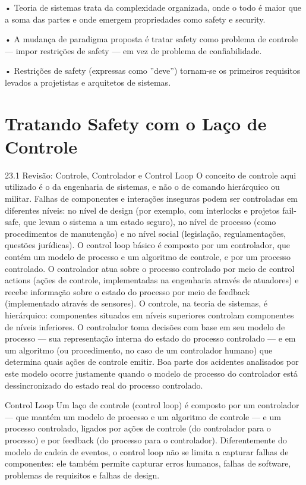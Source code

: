 • Teoria de sistemas trata da complexidade organizada, onde o todo é maior que a soma das partes e onde emergem propriedades como safety e security.

• A mudança de paradigma proposta é tratar safety como problema de controle — impor restrições de safety — em vez de problema de confiabilidade.

• Restrições de safety (expressas como ”deve”) tornam-se os primeiros requisitos levados a projetistas e arquitetos de sistemas.

\chapter{Tratando Safety com o Laço de Controle}

23.1 Revisão: Controle, Controlador e Control Loop O conceito de controle aqui utilizado é o da engenharia de sistemas, e não o de comando hierárquico ou militar. Falhas de componentes e interações inseguras podem ser controladas em diferentes níveis: no nível de design (por exemplo, com interlocks e projetos fail-safe, que levam o sistema a um estado seguro), no nível de processo (como procedimentos de manutenção) e no nível social (legislação, regulamentações, questões jurídicas). O control loop básico é composto por um controlador, que contém um modelo de processo e um algoritmo de controle, e por um processo controlado. O controlador atua sobre o processo controlado por meio de control actions (ações de controle, implementadas na engenharia através de atuadores) e recebe informação sobre o estado do processo por meio de feedback (implementado através de sensores). O controle, na teoria de sistemas, é hierárquico: componentes situados em níveis superiores controlam componentes de níveis inferiores. O controlador toma decisões com base em seu modelo de processo — sua representação interna do estado do processo controlado — e em um algoritmo (ou procedimento, no caso de um controlador humano) que determina quais ações de controle emitir. Boa parte dos acidentes analisados por este modelo ocorre justamente quando o modelo de processo do controlador está dessincronizado do estado real do processo controlado.

Control Loop Um laço de controle (control loop) é composto por um controlador — que mantém um modelo de processo e um algoritmo de controle — e um processo controlado, ligados por ações de controle (do controlador para o processo) e por feedback (do processo para o controlador). Diferentemente do modelo de cadeia de eventos, o control loop não se limita a capturar falhas de componentes: ele também permite capturar erros humanos, falhas de software, problemas de requisitos e falhas de design.

